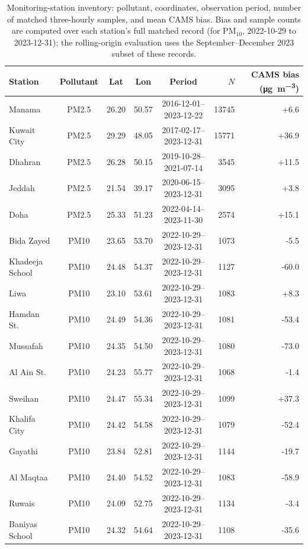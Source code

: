 \documentclass[11pt]{article}
\newcommand*{\pmten}{\ensuremath{\mathrm{PM_{10}}}}
\begin{document}
\clearpage
\begin{table}[htbp]\centering\footnotesize
\caption{Monitoring-station inventory: pollutant, coordinates, observation period, number of matched three-hourly samples, and mean CAMS bias. Bias and sample counts are computed over each station's full matched record (for \pmten{}, 2022-10-29 to 2023-12-31); the rolling-origin evaluation uses the September--December 2023 subset of these records.}
\begin{tabular}{lccccrr}\toprule
Station & Pollutant & Lat & Lon & Period & $N$ & CAMS bias (\si{\micro\gram\per\cubic\metre}) \\ \midrule
Manama & PM2.5 & 26.20 & 50.57 & 2016-12-01--2023-12-22 & 13745 & +6.6 \\
Kuwait City & PM2.5 & 29.29 & 48.05 & 2017-02-17--2023-12-31 & 15771 & +36.9 \\
Dhahran & PM2.5 & 26.28 & 50.15 & 2019-10-28--2021-07-14 & 3545 & +11.5 \\
Jeddah & PM2.5 & 21.54 & 39.17 & 2020-06-15--2023-12-31 & 3095 & +3.8 \\
Doha & PM2.5 & 25.33 & 51.23 & 2022-04-14--2023-11-30 & 2574 & +15.1 \\
Bida Zayed & PM10 & 23.65 & 53.70 & 2022-10-29--2023-12-31 & 1073 & -5.5 \\
Khadeeja School & PM10 & 24.48 & 54.37 & 2022-10-29--2023-12-31 & 1127 & -60.0 \\
Liwa & PM10 & 23.10 & 53.61 & 2022-10-29--2023-12-31 & 1083 & +8.3 \\
Hamdan St. & PM10 & 24.49 & 54.36 & 2022-10-29--2023-12-31 & 1081 & -53.4 \\
Mussafah & PM10 & 24.35 & 54.50 & 2022-10-29--2023-12-31 & 1080 & -73.0 \\
Al Ain St. & PM10 & 24.23 & 55.77 & 2022-10-29--2023-12-31 & 1068 & -1.4 \\
Sweihan & PM10 & 24.47 & 55.34 & 2022-10-29--2023-12-31 & 1099 & +37.3 \\
Khalifa City & PM10 & 24.42 & 54.58 & 2022-10-29--2023-12-31 & 1079 & -52.4 \\
Gayathi & PM10 & 23.84 & 52.81 & 2022-10-29--2023-12-31 & 1144 & -19.7 \\
Al Maqtaa & PM10 & 24.40 & 54.52 & 2022-10-29--2023-12-31 & 1083 & -58.9 \\
Ruwais & PM10 & 24.09 & 52.75 & 2022-10-29--2023-12-31 & 1134 & -3.4 \\
Baniyas School & PM10 & 24.32 & 54.64 & 2022-10-29--2023-12-31 & 1108 & -35.6 \\

\end{tabular}
\end{table}
\end{document}
